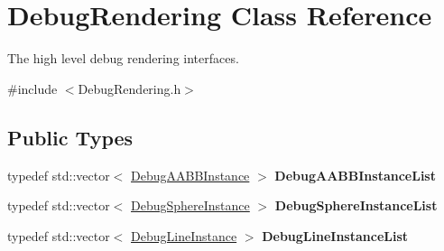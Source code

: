 \hypertarget{classDebugRendering}{}\section{Debug\+Rendering Class Reference}
\label{classDebugRendering}


The high level debug rendering interfaces.  




{\ttfamily \#include $<$Debug\+Rendering.\+h$>$}

\subsection*{Public Types}
\begin{DoxyCompactItemize}
\item 
\mbox{\label{classDebugRendering_ae09e1ad33f1ba1575544cf3c70769ecc}} 
typedef std\+::vector$<$ \hyperlink{structDebugAABBInstance}{Debug\+A\+A\+B\+B\+Instance} $>$ {\bfseries Debug\+A\+A\+B\+B\+Instance\+List}
\item 
\mbox{\label{classDebugRendering_a0dabb4da850186ab6f981b00723834e7}} 
typedef std\+::vector$<$ \hyperlink{structDebugSphereInstance}{Debug\+Sphere\+Instance} $>$ {\bfseries Debug\+Sphere\+Instance\+List}
\item 
\mbox{\label{classDebugRendering_a45d525d5ab2cde6b7bceaf070dd6326a}} 
typedef std\+::vector$<$ \hyperlink{structDebugLineInstance}{Debug\+Line\+Instance} $>$ {\bfseries Debug\+Line\+Instance\+List}
\end{DoxyCompactItemize}
